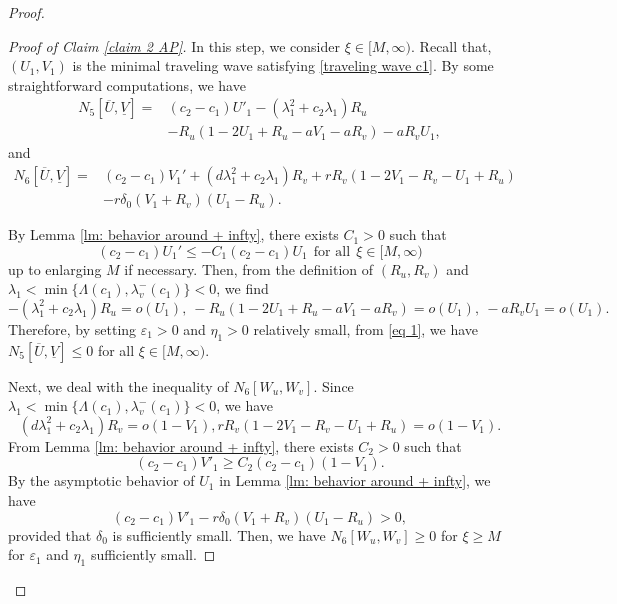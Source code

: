 \documentclass[11pt,a4paper]{article}
\numberwithin{equation}{section}
\numberwithin{figure}{section}
\begin{document}
\begin{proof}
\begin{proof}[Proof of Claim \ref{claim 2 AP}]
In this step, we consider $\xi\in[M,\infty)$. 
Recall that, $(U_1,V_1)$ is the minimal traveling wave satisfying \eqref{traveling wave c1}.
By some  straightforward computations,  we have
\begin{equation}\label{eq 1}
\begin{aligned}
N_5[\overline U,\underline V]=&(c_2-c_1)U'_1-(\lambda_1^2+c_2\lambda_1)R_u\\
&-R_u(1-2U_1+R_u-aV_1-aR_v)-aR_vU_1,
\end{aligned}
\end{equation}
and
\begin{equation}\label{eq 2}
\begin{aligned}
N_6[\overline U,\underline V] = &(c_2-c_1)V_1'+ (d\lambda_1^2+c_2\lambda_1)R_v+ rR_v(1-2V_1-R_v-U_1+R_u)\\
&-r\delta_0(V_1+R_v)(U_1-R_u).
\end{aligned}
\end{equation}

By Lemma \ref{lm: behavior around + infty}, there exists $C_1>0$ such that 
$$(c_2-c_1)U_1'\le -C_1(c_2-c_1)U_1\ \ \text{for all}\ \ \xi\in[M,\infty)$$
up to enlarging $M$ if necessary.
Then, from the definition of $(R_u,R_v)$ and $\lambda_{1}<\min\{\Lambda(c_1),\lambda_v^-(c_1)\}<0$, we find
$$-(\lambda_1^2+c_2\lambda_1)R_u=o(U_1),\ -R_u(1-2U_1+R_u-aV_1-aR_v)=o(U_1),\ -aR_vU_1=o(U_1).$$
Therefore, by setting  $\varepsilon_1>0$ and $\eta_1>0$ relatively small, from \eqref{eq 1}, we have $N_5[\overline U,\underline V]\le 0$ for all $\xi\in[M,\infty)$.


Next, we deal with the inequality of $N_6[W_u, W_v]$. Since $\lambda_{1}<\min\{\Lambda(c_1),\lambda_v^-(c_1)\}<0$, we have
$$ (d\lambda_1^2+c_2\lambda_1)R_v=o(1-V_1), rR_v(1-2V_1-R_v-U_1+R_u)=o(1-V_1).$$
From Lemma \ref{lm: behavior around + infty}, there exists $C_2>0$ such that 
$$(c_2-c_1)V'_1\ge C_2(c_2-c_1)(1-V_1).$$
By the asymptotic behavior of $U_1$ in Lemma \ref{lm: behavior around + infty}, we have
$$(c_2-c_1)V'_1-r\delta_0(V_1+R_v)(U_1-R_u)>0,$$
provided that $\delta_0$ is sufficiently small.
Then, we have $N_6[W_u,W_v]\geq0$
for $\xi\geq M$ for $\varepsilon_1$  and $\eta_1$ sufficiently small. 


\end{proof}
\end{proof}
\end{document}
